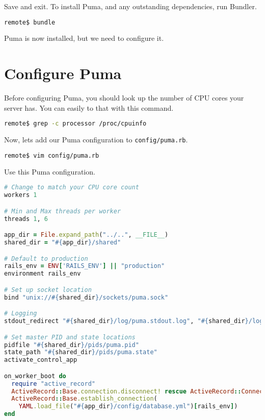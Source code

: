 Save and exit. To install Puma, and any outstanding dependencies, run Bundler.

\begin{minipage}{\linewidth}
\begin{lstlisting}[language=bash]
remote$ bundle
\end{lstlisting}
\end{minipage}

Puma is now installed, but we need to configure it.

\section{Configure Puma}

Before configuring Puma, you should look up the number of CPU cores
your server has. You can easily to that with this command.

\begin{minipage}{\linewidth}
\begin{lstlisting}[language=bash]
remote$ grep -c processor /proc/cpuinfo
\end{lstlisting}
\end{minipage}

Now, let\textquotesingle s add our Puma configuration to \texttt{config/puma.rb}.

\begin{minipage}{\linewidth}
\begin{lstlisting}[language=bash]
remote$ vim config/puma.rb
\end{lstlisting}
\end{minipage}

Use this Puma configuration.

\begin{minipage}{\linewidth}
  \begin{lstlisting}[language=ruby, caption={config/puma.rb}]
# Change to match your CPU core count
workers 1

# Min and Max threads per worker
threads 1, 6

app_dir = File.expand_path("../..", __FILE__)
shared_dir = "#{app_dir}/shared"

# Default to production
rails_env = ENV['RAILS_ENV'] || "production"
environment rails_env

# Set up socket location
bind "unix://#{shared_dir}/sockets/puma.sock"

# Logging
stdout_redirect "#{shared_dir}/log/puma.stdout.log", "#{shared_dir}/log/puma.stderr.log", true

# Set master PID and state locations
pidfile "#{shared_dir}/pids/puma.pid"
state_path "#{shared_dir}/pids/puma.state"
activate_control_app

on_worker_boot do
  require "active_record"
  ActiveRecord::Base.connection.disconnect! rescue ActiveRecord::ConnectionNotEstablished
  ActiveRecord::Base.establish_connection(
    YAML.load_file("#{app_dir}/config/database.yml")[rails_env])
end
\end{lstlisting}
\end{minipage}

